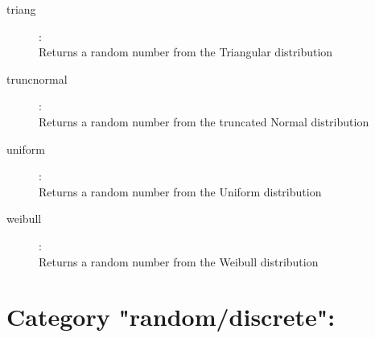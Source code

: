 \begin{description}
\item[triang]:  \\
    Returns a random number from the Triangular distribution

\item[truncnormal]:  \\
    Returns a random number from the truncated Normal distribution

\item[uniform]:  \\
    Returns a random number from the Uniform distribution

\item[weibull]:  \\
    Returns a random number from the Weibull distribution


\end{description}

\section{Category "random/discrete":}
\label{sec:ned-functions:category-random-discrete}

